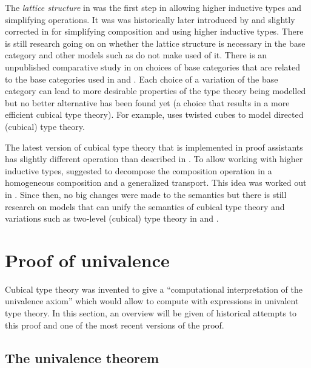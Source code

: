 \documentclass[12pt,a4paper,twoside,xetex]{book} %
\newcommand{\keyword}[1]{\emph{#1}\index{#1}}
\begin{document}
The \keyword{lattice structure} in   was the first step in allowing higher inductive types and simplifying operations. It was  was historically 
later introduced by \cite{Cohen2016} and slightly corrected in \cite{Huber2016} for simplifying composition and using 
higher inductive types. There is still research going on on whether the lattice structure is necessary in the base category and other models such as \cite{Altenkirch2015} do not make used of it.
There is an unpublished comparative study in \cite{Awodey2016June} on choices of base categories that are related to the base categories used in \cite{Bezem2014} and \cite{Huber2016}. Each choice of a variation of the base category can lead to more desirable properties of the type theory being modelled but no better alternative has been found yet (a choice that results in a more efficient cubical type theory). For example, \cite{Gun2019} uses twisted cubes to model directed (cubical) type theory.

The latest version of cubical type theory that is implemented in proof assistants has slightly different operation than described in \cite{Huber2016}. To allow working with higher inductive types, \cite{Huber17note} suggested to decompose the composition operation in a homogeneous composition and a generalized transport. This idea was worked out in \cite{Coquand2018}. Since then, no big changes were made to the semantics but there is still research on models that can unify the semantics of cubical type theory and variations such as two-level (cubical) type theory in \cite{Uem19} and \cite{Cavallo2019}. %


\chapter{Proof of univalence}\label{univalenceproof}

Cubical type theory was invented to give a ``computational interpretation of 
the univalence axiom'' which would allow to compute with expressions in 
univalent type theory. In this section, an overview will be given of 
historical attempts to this proof and one of the most recent versions of the 
proof.


\section{The univalence theorem}
\end{document}
